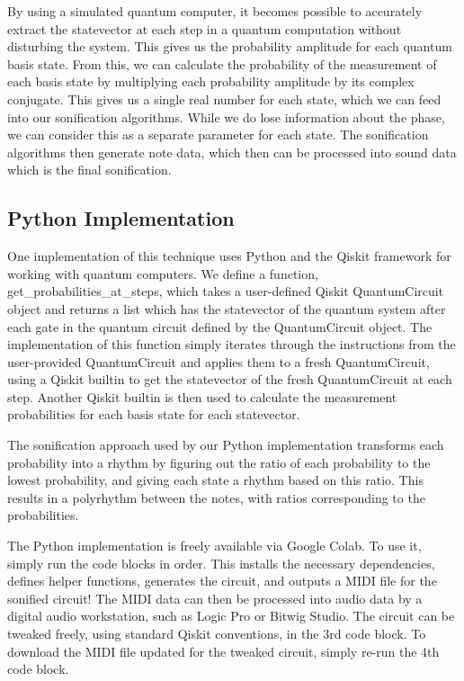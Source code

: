 \documentclass[10pt,twocolumn]{article}
\begin{document}
By using a simulated quantum computer, it becomes possible to accurately extract the statevector at each step in a quantum computation without disturbing the system\cite{qiskitstatevectordocs}. This gives us the probability amplitude for each quantum basis state. From this, we can calculate the probability of the measurement of each basis state by multiplying each probability amplitude by its complex conjugate. This gives us a single real number for each state, which we can feed into our sonification algorithms. While we do lose information about the phase, we can consider this as a separate parameter for each state. The sonification algorithms then generate note data, which then can be processed into sound data which is the final sonification.

\subsection{Python Implementation}

One implementation of this technique uses Python\cite{pythonlang} and the Qiskit\cite{qiskit} framework for working with quantum computers. We define a function, get\_probabilities\_at\_steps, which takes a user-defined Qiskit QuantumCircuit object and returns a list which has the statevector of the quantum system after each gate in the quantum circuit defined by the QuantumCircuit object. The implementation of this function simply iterates through the instructions from the user-provided QuantumCircuit and applies them to a fresh QuantumCircuit, using a Qiskit builtin to get the statevector of the fresh QuantumCircuit at each step. Another Qiskit builtin is then used to calculate the measurement probabilities for each basis state for each statevector.

The sonification approach used by our Python implementation transforms each probability into a rhythm by figuring out the ratio of each probability to the lowest probability, and giving each state a rhythm based on this ratio. This results in a polyrhythm between the notes, with ratios corresponding to the probabilities. 

The Python implementation is freely available via Google Colab\cite{googlecolab}. To use it, simply run the code blocks in order. This installs the necessary dependencies, defines helper functions, generates the circuit, and outputs a MIDI\cite{midi1spec} file for the sonified circuit! The MIDI data can then be processed into audio data by a digital audio workstation, such as Logic Pro\cite{logicpro} or Bitwig Studio\cite{bitwigstudio}. The circuit can be tweaked freely, using standard Qiskit conventions, in the 3rd code block. To download the MIDI file updated for the tweaked circuit, simply re-run the 4th code block.
\end{document}
